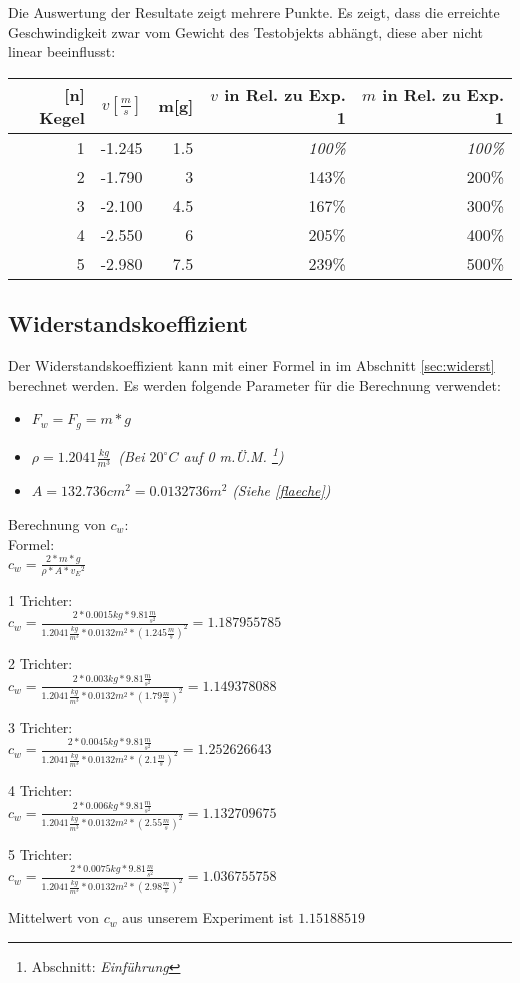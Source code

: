 Die Auswertung der Resultate zeigt mehrere Punkte. Es zeigt, dass die erreichte Geschwindigkeit zwar vom Gewicht des Testobjekts abhängt, diese aber nicht linear beeinflusst:

\begin{tabular}{rrrrr}
	\textbf{[n] Kegel} & \(v[\frac{m}{s}]\) & m[g] & {\small \(v\) in Rel. zu Exp. 1} & {\small \(m\) in Rel. zu Exp. 1} \\ \hline
	1 & -1.245 & 1.5 & \textit{100\%} & \textit{100\%} \\
	2 & -1.790 & 3   & 143\% & 200\% \\
	3 & -2.100 & 4.5 & 167\% & 300\% \\
	4 & -2.550 & 6   & 205\% & 400\% \\
	5 & -2.980 & 7.5 & 239\% & 500\% \\
\end{tabular}

\subsection{Widerstandskoeffizient}

Der Widerstandskoeffizient kann mit einer Formel in im Abschnitt \ref{sec:widerst} berechnet werden. Es werden folgende Parameter für die Berechnung verwendet:
\begin{itemize}
	\item \(F_w = F_g = m * g\)
	\item \(\rho = 1.2041 \frac{kg}{m^{3}} \)\ \textit{(Bei \(20^\circ C \) auf 0 m.Ü.M. \footnote{\cite{wikiluftdichte} Abschnitt: \textit{Einführung}})}
	\item \(A = 132.736 cm^2 = 0.0132736 m^2\) \textit{(Siehe \ref{flaeche})}
\end{itemize}

Berechnung von $ c_w $: \\

Formel: \\
$ c_w = \frac{2 * {m} * {g} }{\rho  * A * {v_E} ^{2}} $

1 Trichter: \\
 $ c_w = \frac{2 * 0.0015kg * 9.81\frac{m}{s^{2}}}{1.2041\frac{kg}{m^3}  * 0.0132 m^2 * (1.245\frac{m}{s})^2} = 1.187955785$

2 Trichter: \\
 $ c_w = \frac{2 * 0.003kg * 9.81\frac{m}{s^{2}}}{1.2041\frac{kg}{m^3}  * 0.0132 m^2 * (1.79\frac{m}{s})^2} = 1.149378088$

3 Trichter: \\
 $ c_w = \frac{2 * 0.0045kg * 9.81\frac{m}{s^{2}}}{1.2041\frac{kg}{m^3}  * 0.0132 m^2 * (2.1\frac{m}{s})^2} = 1.252626643$

4 Trichter: \\
 $ c_w = \frac{2 * 0.006kg * 9.81\frac{m}{s^{2}}}{1.2041\frac{kg}{m^3}  * 0.0132 m^2 * (2.55\frac{m}{s})^2} = 1.132709675$

5 Trichter: \\
 $ c_w = \frac{2 * 0.0075kg * 9.81\frac{m}{s^{2}}}{1.2041\frac{kg}{m^3}  * 0.0132 m^2 * (2.98\frac{m}{s})^2} = 1.036755758$

Mittelwert von $c_w$ aus unserem Experiment ist $ 1.15188519 $ 


